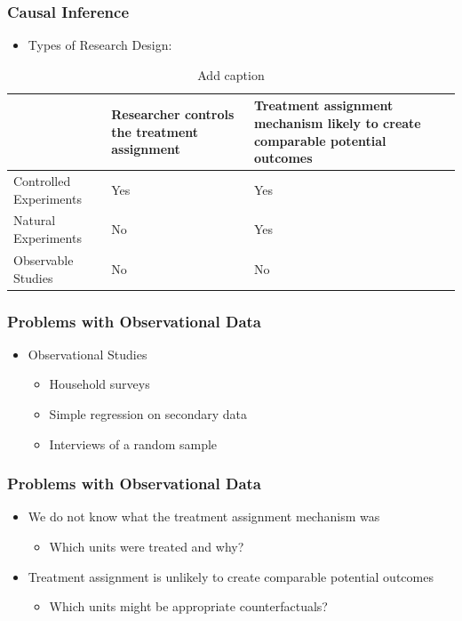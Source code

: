 \documentclass[xcolor=x11names,compress]{beamer}\usepackage[]{graphicx}\usepackage[]{color}
\renewcommand{\(}{\begin{columns}}
\renewcommand{\)}{\end{columns}}
\newcommand{\<}[1]{\begin{column}{#1}}
\renewcommand{\>}{\end{column}}
\begin{document}
\begin{frame}
\frametitle{Causal Inference}
\begin{itemize}
\item Types of Research Design:
\end{itemize}
\begin{table}[htbp]
  \centering
  \caption{Add caption}
    \begin{tabular}{|>{\raggedright}p{5cm}|p{5cm}|p{5cm}|}
    \toprule
          & Researcher controls the treatment assignment & Treatment assignment mechanism likely to create comparable potential outcomes \\
    \midrule
    Controlled Experiments & Yes   & Yes \\
    \midrule
    Natural Experiments & No    & Yes \\
    \midrule
    Observable Studies & No    & No \\
    \bottomrule
    \end{tabular}%
  \label{tab:addlabel}%
\end{table}%
\end{frame}

\begin{frame}
\frametitle{Problems with Observational Data}
\begin{itemize}
\item Observational Studies
\begin{itemize}
\item Household surveys
\item Simple regression on secondary data
\item Interviews of a random sample
\end{itemize}
\end{itemize}
\end{frame}

\begin{frame}
\frametitle{Problems with Observational Data}
\begin{itemize}
\item We do not know what the treatment assignment mechanism was
\begin{itemize}
\item Which units were treated and why?
\end{itemize}
\item Treatment assignment is unlikely to create comparable potential outcomes
\begin{itemize}
\item Which units might be appropriate counterfactuals?
\end{itemize}
\end{itemize}
\end{frame}
\end{document}
